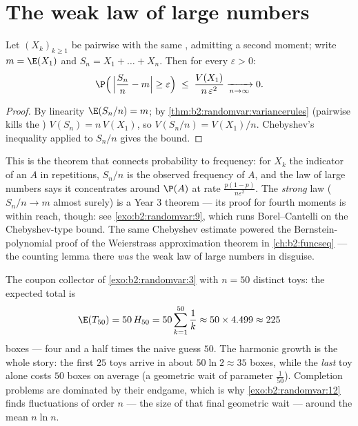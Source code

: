 \section{The weak law of large numbers}

\begin{theorem}\label{thm:b2:randomvar:lln}
Let $(X_k)_{k \geq 1}$ be pairwise  
with the same , admitting a second moment; write $m = \E(X_1)$
and $S_n = X_1 + \dots + X_n$. Then for every $\varepsilon > 0$:
\[
\P\Bigl(\,\Bigl|\frac{S_n}{n} - m\Bigr| \geq \varepsilon\Bigr)
\;\leq\; \frac{V(X_1)}{n\,\varepsilon^2}
\xrightarrow[n \to \infty]{} 0 .
\]
\end{theorem}

\begin{proof}
By linearity $\E(S_n/n) = m$; by
\cref{thm:b2:randomvar:variancerules} (pairwise 
kills the ) $V(S_n) = n\,V(X_1)$, so $V(S_n/n) =
V(X_1)/n$. Chebyshev's inequality applied to $S_n/n$ gives the
bound.
\end{proof}

\begin{remark}
This is the theorem that connects probability to frequency: for
$X_k$ the indicator of an  $A$ in  repetitions,
$S_n/n$ is the observed frequency of $A$, and the law of large
numbers says it concentrates around $\P(A)$ at rate
$\frac{p(1-p)}{n\varepsilon^2}$. The \emph{strong} law ($S_n/n \to
m$ almost surely) is a Year 3 theorem --- its proof for fourth
moments is within reach, though: see \cref{exo:b2:randomvar:9},
which runs Borel--Cantelli on the Chebyshev-type bound. The same
Chebyshev estimate powered the Bernstein-polynomial proof of the
Weierstrass approximation theorem in \cref{ch:b2:funcseq} --- the
counting lemma there \emph{was} the weak law of large numbers in
disguise.
\end{remark}

\begin{example}
\label{ex:b2:randomvar:couponnumeric}
The coupon collector of \cref{exo:b2:randomvar:3} with $n =
50$ distinct toys: the expected total is
\[
\E(T_{50}) = 50\,H_{50} = 50\sum_{k=1}^{50}\frac1k
\approx 50 \times 4.499 \approx 225
\]
boxes --- four and a half times the naive guess $50$. The
harmonic growth is the whole story: the first $25$ toys
arrive in about $50\ln2 \approx 35$ boxes, while the
\emph{last} toy alone costs $50$ boxes on average (a
geometric wait of parameter $\frac1{50}$). Completion
problems are dominated by their endgame, which is why
\cref{exo:b2:randomvar:12} finds fluctuations of order $n$
--- the size of that final geometric wait --- around the
mean $n\ln n$.
\end{example}

